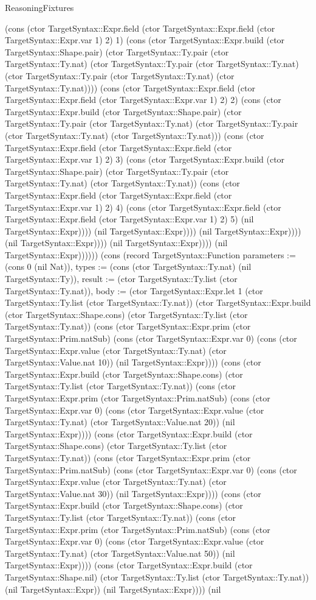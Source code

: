 \begin{lexlean}{ReasoningFixtures}
\begin{semanticmodule}
{(cons (ctor TargetSyntax::Expr.field (ctor TargetSyntax::Expr.field (ctor TargetSyntax::Expr.var 1) 2) 1) (cons (ctor TargetSyntax::Expr.build (ctor TargetSyntax::Shape.pair) (ctor TargetSyntax::Ty.pair (ctor TargetSyntax::Ty.nat) (ctor TargetSyntax::Ty.pair (ctor TargetSyntax::Ty.nat) (ctor TargetSyntax::Ty.pair (ctor TargetSyntax::Ty.nat) (ctor TargetSyntax::Ty.nat)))) (cons (ctor TargetSyntax::Expr.field (ctor TargetSyntax::Expr.field (ctor TargetSyntax::Expr.var 1) 2) 2) (cons (ctor TargetSyntax::Expr.build (ctor TargetSyntax::Shape.pair) (ctor TargetSyntax::Ty.pair (ctor TargetSyntax::Ty.nat) (ctor TargetSyntax::Ty.pair (ctor TargetSyntax::Ty.nat) (ctor TargetSyntax::Ty.nat))) (cons (ctor TargetSyntax::Expr.field (ctor TargetSyntax::Expr.field (ctor TargetSyntax::Expr.var 1) 2) 3) (cons (ctor TargetSyntax::Expr.build (ctor TargetSyntax::Shape.pair) (ctor TargetSyntax::Ty.pair (ctor TargetSyntax::Ty.nat) (ctor TargetSyntax::Ty.nat)) (cons (ctor TargetSyntax::Expr.field (ctor TargetSyntax::Expr.field (ctor TargetSyntax::Expr.var 1) 2) 4) (cons (ctor TargetSyntax::Expr.field (ctor TargetSyntax::Expr.field (ctor TargetSyntax::Expr.var 1) 2) 5) (nil TargetSyntax::Expr)))) (nil TargetSyntax::Expr)))) (nil TargetSyntax::Expr)))) (nil TargetSyntax::Expr)))) (nil TargetSyntax::Expr)))) (nil TargetSyntax::Expr)))))}) (cons (record TargetSyntax::Function {parameters := (cons 0 (nil Nat)), types := (cons (ctor TargetSyntax::Ty.nat) (nil TargetSyntax::Ty)), result := (ctor TargetSyntax::Ty.list (ctor TargetSyntax::Ty.nat)), body := (ctor TargetSyntax::Expr.let 1 (ctor TargetSyntax::Ty.list (ctor TargetSyntax::Ty.nat)) (ctor TargetSyntax::Expr.build (ctor TargetSyntax::Shape.cons) (ctor TargetSyntax::Ty.list (ctor TargetSyntax::Ty.nat)) (cons (ctor TargetSyntax::Expr.prim (ctor TargetSyntax::Prim.natSub) (cons (ctor TargetSyntax::Expr.var 0) (cons (ctor TargetSyntax::Expr.value (ctor TargetSyntax::Ty.nat) (ctor TargetSyntax::Value.nat 10)) (nil TargetSyntax::Expr)))) (cons (ctor TargetSyntax::Expr.build (ctor TargetSyntax::Shape.cons) (ctor TargetSyntax::Ty.list (ctor TargetSyntax::Ty.nat)) (cons (ctor TargetSyntax::Expr.prim (ctor TargetSyntax::Prim.natSub) (cons (ctor TargetSyntax::Expr.var 0) (cons (ctor TargetSyntax::Expr.value (ctor TargetSyntax::Ty.nat) (ctor TargetSyntax::Value.nat 20)) (nil TargetSyntax::Expr)))) (cons (ctor TargetSyntax::Expr.build (ctor TargetSyntax::Shape.cons) (ctor TargetSyntax::Ty.list (ctor TargetSyntax::Ty.nat)) (cons (ctor TargetSyntax::Expr.prim (ctor TargetSyntax::Prim.natSub) (cons (ctor TargetSyntax::Expr.var 0) (cons (ctor TargetSyntax::Expr.value (ctor TargetSyntax::Ty.nat) (ctor TargetSyntax::Value.nat 30)) (nil TargetSyntax::Expr)))) (cons (ctor TargetSyntax::Expr.build (ctor TargetSyntax::Shape.cons) (ctor TargetSyntax::Ty.list (ctor TargetSyntax::Ty.nat)) (cons (ctor TargetSyntax::Expr.prim (ctor TargetSyntax::Prim.natSub) (cons (ctor TargetSyntax::Expr.var 0) (cons (ctor TargetSyntax::Expr.value (ctor TargetSyntax::Ty.nat) (ctor TargetSyntax::Value.nat 50)) (nil TargetSyntax::Expr)))) (cons (ctor TargetSyntax::Expr.build (ctor TargetSyntax::Shape.nil) (ctor TargetSyntax::Ty.list (ctor TargetSyntax::Ty.nat)) (nil TargetSyntax::Expr)) (nil TargetSyntax::Expr)))) (nil }
\end{semanticmodule}
\end{lexlean}
